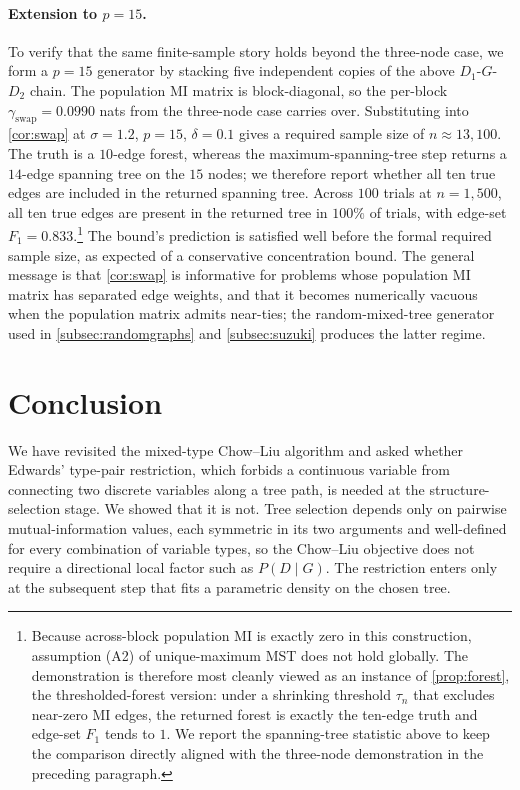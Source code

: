 \paragraph{\texorpdfstring{Extension to $p = 15$.}{Extension to p = 15.}}
To verify that the same finite-sample story holds beyond the
three-node case, we form a $p = 15$ generator by stacking five
independent copies of the above $D_1$-$G$-$D_2$ chain. The
population MI matrix is block-diagonal, so the per-block
$\gamma_{\mathrm{swap}} = 0.0990$ nats from the three-node case
carries over. Substituting into \cref{cor:swap} at $\sigma =
1.2$, $p = 15$, $\delta = 0.1$ gives a required sample size of
$n \approx 13{,}100$. The truth is a $10$-edge forest, whereas the
maximum-spanning-tree step returns a $14$-edge spanning tree on the
$15$ nodes; we therefore report whether all ten true edges are
included in the returned spanning tree. Across $100$ trials at
$n = 1{,}500$, all ten true edges are present in the returned tree
in $100\%$ of trials, with edge-set $F_1 = 0.833$.\footnote{Because
across-block population MI is exactly zero in this construction,
assumption (A2) of unique-maximum MST does not hold globally. The
demonstration is therefore most cleanly viewed as an instance of
\cref{prop:forest}, the thresholded-forest version: under a
shrinking threshold $\tau_n$ that excludes near-zero MI edges, the
returned forest is exactly the ten-edge truth and edge-set $F_1$
tends to $1$. We report the spanning-tree statistic above to keep
the comparison directly aligned with the three-node demonstration in
the preceding paragraph.} The bound's prediction is satisfied well
before the formal required sample size, as expected of a
conservative concentration bound. The general message is that \cref{cor:swap} is informative
for problems whose population MI matrix has separated edge weights,
and that it becomes numerically vacuous when the population matrix
admits near-ties; the
random-mixed-tree generator used in \cref{subsec:randomgraphs} and
\cref{subsec:suzuki} produces the latter regime.

\section{Conclusion}
\label{sec:conclusion}

We have revisited the mixed-type Chow--Liu algorithm and asked
whether Edwards' type-pair restriction, which forbids a
continuous variable from connecting two discrete variables along
a tree path, is needed at the structure-selection stage. We
showed that it is not. Tree selection depends only on pairwise
mutual-information values, each symmetric in its two arguments
and well-defined for every combination of variable types, so the
Chow--Liu objective does not require a directional local factor
such as $P(D \mid G)$. The restriction enters only at the
subsequent step that fits a parametric density on the chosen
tree.

